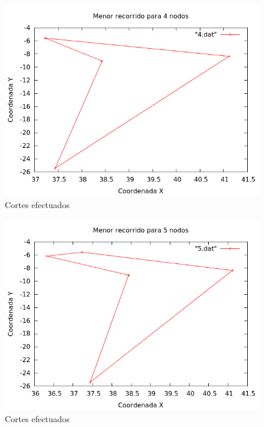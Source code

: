 \begin{figure}[H]
    \centering
    \includegraphics[scale=0.5]{../TSP/Graficas/4.png}
    \caption{Cortes efectuados}
\end{figure}

\begin{figure}[H]
    \centering
    \includegraphics[scale=0.5]{../TSP/Graficas/5.png}
    \caption{Cortes efectuados}
\end{figure}

